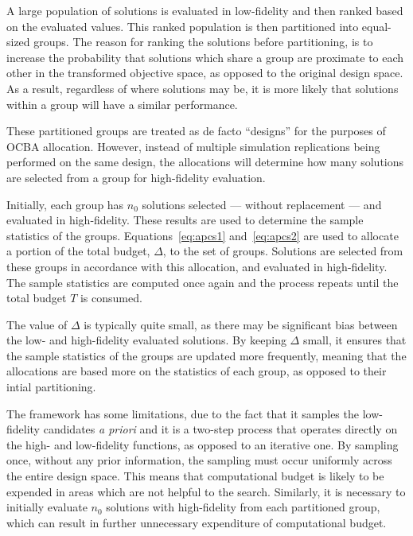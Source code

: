 A large population of solutions is evaluated in low-fidelity and then ranked based on the evaluated values. This ranked population is then partitioned into equal-sized groups. The reason for ranking the solutions before partitioning, is to increase the probability that solutions which share a group are proximate to each other in the transformed objective space, as opposed to the original design space. As a result, regardless of where solutions may be, it is more likely that solutions within a group will have a similar performance.

These partitioned groups are treated as de facto ``designs'' for the purposes of OCBA allocation. However, instead of multiple simulation replications being performed on the same design, the allocations will determine how many solutions are selected from a group for high-fidelity evaluation.

Initially, each group has $n_0$ solutions selected --- without replacement --- and evaluated in high-fidelity. These results are used to determine the sample statistics of the groups. Equations~\ref{eq:apcs1} and~\ref{eq:apcs2} are used to allocate a portion of the total budget, $\Delta$, to the set of groups. Solutions are selected from these groups in accordance with this allocation, and evaluated in high-fidelity. The sample statistics are computed once again and the process repeats until the total budget $T$ is consumed. 

The value of $\Delta$ is typically quite small, as there may be significant bias between the low- and high-fidelity evaluated solutions. By keeping $\Delta$ small, it ensures that the sample statistics of the groups are updated more frequently, meaning that the allocations are based more on the statistics of each group, as opposed to their intial partitioning.

The \motos{} framework has some limitations, due to the fact that it samples the low-fidelity candidates \emph{a priori} and it is a two-step process that operates directly on the high- and low-fidelity functions, as opposed to an iterative one. By sampling once, without any prior information, the sampling must occur uniformly across the entire design space. This means that computational budget is likely to be expended in areas which are not helpful to the search. Similarly, it is necessary to initially evaluate $n_0$ solutions with high-fidelity from each partitioned group, which can result in further unnecessary expenditure of computational budget.%

